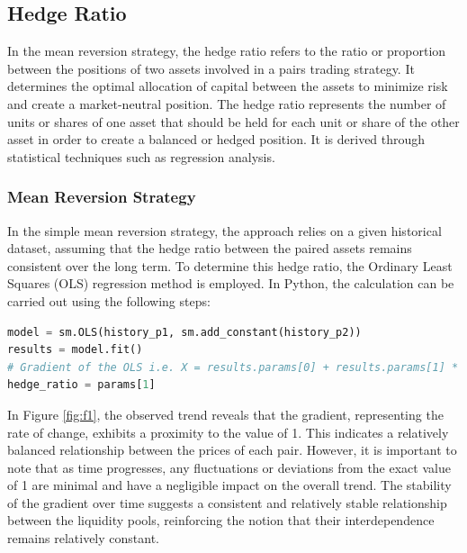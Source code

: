 \subsection{Hedge Ratio}
In the mean reversion strategy, the hedge ratio refers to the ratio or proportion between the positions of two assets involved in a pairs trading strategy. It determines the optimal allocation of capital between the assets to minimize risk and create a market-neutral position. The hedge ratio represents the number of units or shares of one asset that should be held for each unit or share of the other asset in order to create a balanced or hedged position. It is derived through statistical techniques such as regression analysis.

\subsubsection{Mean Reversion Strategy}
In the simple mean reversion strategy, the approach relies on a given historical dataset, assuming that the hedge ratio between the paired assets remains consistent over the long term. To determine this hedge ratio, the Ordinary Least Squares (OLS) regression method is employed. In Python, the calculation can be carried out using the following steps:
\vspace{5mm}
\begin{lstlisting}[language=Python]
model = sm.OLS(history_p1, sm.add_constant(history_p2))
results = model.fit()
# Gradient of the OLS i.e. X = results.params[0] + results.params[1] * 'p2_token1_price'
hedge_ratio = params[1]
\end{lstlisting}
\vspace{5mm}
In Figure \ref{fig:f1}, the observed trend reveals that the gradient, representing the rate of change, exhibits a proximity to the value of 1. This indicates a relatively balanced relationship between the prices of each pair. However, it is important to note that as time progresses, any fluctuations or deviations from the exact value of 1 are minimal and have a negligible impact on the overall trend. The stability of the gradient over time suggests a consistent and relatively stable relationship between the liquidity pools, reinforcing the notion that their interdependence remains relatively constant.
